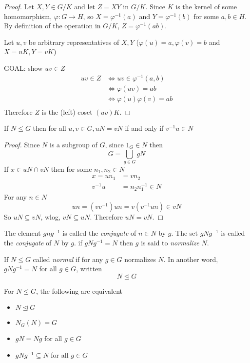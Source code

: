 \begin{proof}
  Let $X, Y \in G/K$ and let $Z = XY$ in $G/K$. Since $K$ is the kernel of some homomorphism,
  $\varphi: G \to H$, so $X = \varphi^{-1}(a)$ and $Y = \varphi^{-1}(b)$ for some $a, b \in H$.
  By definition of the operation in $G/K$, $Z = \varphi^{-1}(ab)$. 

  Let $u, v$ be arbitrary representatives of $X, Y$ ($\varphi(u) = a, \varphi(v)=b$ and $X = uK, Y = vK$)

  GOAL: show $uv \in Z$
  \begin{align*}
    uv \in Z &\iff uv \in \varphi^{-1}(a, b) \\
    &\iff \varphi(uv) = ab \\
    &\iff \varphi(u)\varphi(v) = ab \\ 
  \end{align*}
  Therefore $Z$ is the (left) coset $(uv)K$.
\end{proof}

\begin{proposition}
  If $N \le G$ then for all $u, v \in G, uN = vN$ if and only if $v^{-1}u\in N$
\end{proposition}

\begin{proof}
  Since $N$ is a subgroup of $G$, since $1_G \in N$ then 
  \[G = \bigcup_{g \in G} gN\]
  If $x \in uN \cap vN$ then for some $n_1, n_2 \in N$
  \begin{align*}
    x = un_1 &= vn_2 \\ 
    v^{-1}u &= n_2 n_1^{-1} \in N
  \end{align*}
  For any $n \in N$
  \[un = (vv^{-1})un = v(v^{-1}un) \in vN\]
  So $uN \subseteq vN$, wlog, $vN \subseteq uN$. Therefore $uN = vN$.
\end{proof}

\begin{definition}
  The element $gng^{-1}$ is called the \textit{conjugate} of $n \in N$ by $g$.
  The set $gNg^{-1}$ is called the \textit{conjugate} of $N$ by $g$.
  if $gNg^{-1} = N$ then $g$ is said to \textit{normalize} $N$. 

  If $N \le G$ called \textit{normal} if for any $g \in G$ normalizes $N$. In another word, $gNg^{-1} = N$ for all $g \in G$, written
  \[N \trianglelefteq G\]
\end{definition}

\begin{theorem}
  For $N \le G$, the following are equivalent
  \begin{itemize}
    \item $N \trianglelefteq G$
    \item $N_G(N) = G$
    \item $gN = Ng$ for all $g \in G$

    \item $gNg^{-1} \subseteq N$ for all $g \in G$
  \end{itemize}
\end{theorem}

